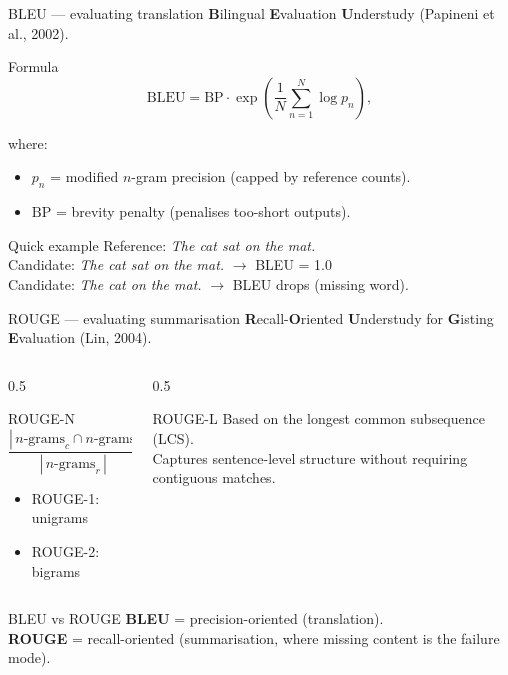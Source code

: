 \documentclass[11pt,aspectratio=169]{beamer}
\begin{document}
\begin{frame}{BLEU --- evaluating translation}
\textbf{B}ilingual \textbf{E}valuation \textbf{U}nderstudy (Papineni et al., 2002).
\begin{block}{Formula}
\[ \mathrm{BLEU} = \mathrm{BP} \cdot \exp\!\left( \frac{1}{N} \sum_{n=1}^{N} \log p_n \right), \]
\end{block}
where:
\begin{itemize}
    \item $p_n$ = modified $n$-gram precision (capped by reference counts).
    \item $\mathrm{BP}$ = brevity penalty (penalises too-short outputs).
\end{itemize}
\vfill
\begin{exampleblock}{Quick example}
Reference: \emph{The cat sat on the mat.}\\
Candidate: \emph{The cat sat on the mat.} $\to$ BLEU = 1.0\\
Candidate: \emph{The cat on the mat.} $\to$ BLEU drops (missing word).
\end{exampleblock}
\end{frame}

\begin{frame}{ROUGE --- evaluating summarisation}
\textbf{R}ecall-\textbf{O}riented \textbf{U}nderstudy for \textbf{G}isting \textbf{E}valuation (Lin, 2004).
\begin{columns}[T]
\begin{column}{0.5\textwidth}
\begin{block}{ROUGE-N}
\[ \frac{|\,n\text{-grams}_c \cap n\text{-grams}_r\,|}{|\,n\text{-grams}_r\,|} \]
\begin{itemize}
    \item ROUGE-1: unigrams
    \item ROUGE-2: bigrams
\end{itemize}
\end{block}
\end{column}
\begin{column}{0.5\textwidth}
\begin{block}{ROUGE-L}
Based on the longest common subsequence (LCS).\\[0.3em]
Captures sentence-level structure without requiring contiguous matches.
\end{block}
\end{column}
\end{columns}
\vfill
\begin{exampleblock}{BLEU vs ROUGE}
\textbf{BLEU} = precision-oriented (translation).\\
\textbf{ROUGE} = recall-oriented (summarisation, where missing content is the failure mode).
\end{exampleblock}
\end{frame}
\end{document}
